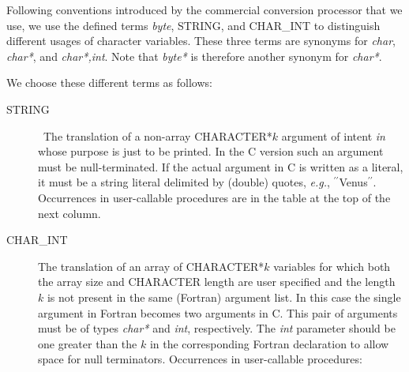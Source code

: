 \documentclass[twoside]{MATH77}
\begin{document}
Following conventions introduced by the commercial conversion
processor that we use, we use the defined terms {\em byte}, STRING,
and CHAR\_INT to distinguish different usages of character variables.
These three terms are synonyms for {\em char}, {\em char*}, and {\em
char*,int}. Note that {\em byte*} is therefore another synonym for
{\em char*}.

We choose these different terms as follows:\vspace{-7pt}
\begin{description}

\item[STRING\label{string}] \ The translation of a non-array CHARACTER*$k$
argument of intent {\em in} whose purpose is just to be printed.  In the C
version such an argument must be null-terminated.  If the actual argument
in C is written as a literal, it must be a string literal delimited by
(double) quotes, {\em e.g.}, $^{\prime \prime}$Venus$^{\prime \prime}$.
Occurrences in user-callable procedures are in the table at the top of the
next column.

\item[CHAR\_INT\label{char}] The translation of an array of
CHARACTER*$k$ variables for which both the array size and CHARACTER
length are user specified and the length $k$ is not present in the
same (Fortran) argument list. In this case the single argument in
Fortran becomes two arguments in C. This pair of arguments must be of
types {\em char*} and {\em int}, respectively. The {\em int}
parameter should be one greater than the $k$ in the corresponding
Fortran declaration to allow space for null terminators. Occurrences
in user-callable procedures:


\end{description}
\end{document}
